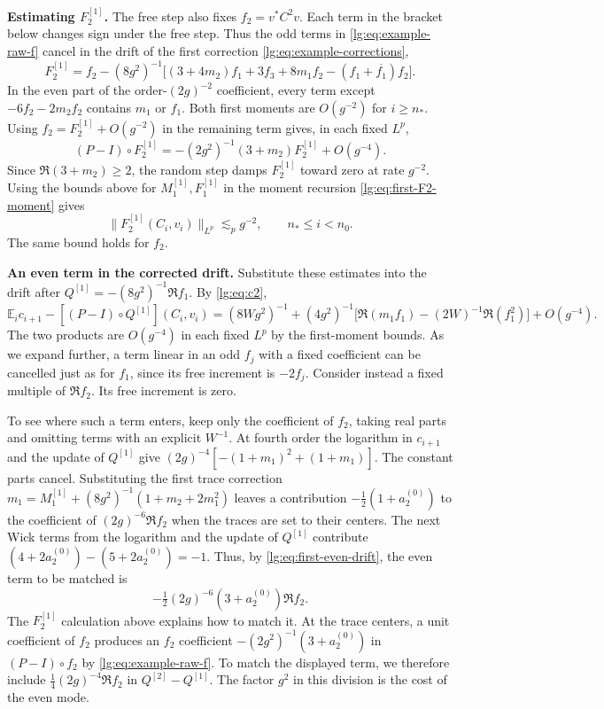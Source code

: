 \documentclass[11pt]{article}
\numberwithin{equation}{section}
\theoremstyle{remark}
\newcommand{\E}{\mathbb E}
\begin{document}
\medskip\noindent\textbf{Estimating $F_2^{[1]}$.}
The free step also fixes $f_2=v^*C^2v$. Each term in the bracket
below changes sign under the free step. Thus the odd terms in
\eqref{lg:eq:example-raw-f} cancel in the drift of the first
correction \eqref{lg:eq:example-corrections},
\[
 F_2^{[1]}=f_2-(8g^2)^{-1}
 \bigl[(3+4m_2)f_1+3f_3+8m_1f_2-(f_1+\overline{f_1})f_2\bigr].
\]
In the even part of the order-$(2g)^{-2}$ coefficient, every term
except $-6f_2-2m_2f_2$ contains $m_1$ or $f_1$. Both first moments
are $O(g^{-2})$ for $i\ge n_*$. Using $f_2=F_2^{[1]}+O(g^{-2})$
in the remaining term gives, in each fixed $L^p$,
\[
 (P-I)\circ F_2^{[1]}
 =-(2g^2)^{-1}(3+m_2)F_2^{[1]}+O(g^{-4}).
\]
Since $\Re(3+m_2)\ge2$, the random step damps $F_2^{[1]}$ toward
zero at rate $g^{-2}$. Using the bounds above for
$M_1^{[1]},F_1^{[1]}$ in the moment recursion
\eqref{lg:eq:first-F2-moment} gives
\[
 \|F_2^{[1]}(C_i,v_i)\|_{L^p}\lesssim_p g^{-2},
 \qquad n_*\le i<n_0.
\]
The same bound holds for $f_2$.

\medskip\noindent\textbf{An even term in the corrected drift.}
Substitute these estimates into the drift after
$Q^{[1]}=-(8g^2)^{-1}\Re f_1$. By \eqref{lg:eq:c2},
\[
 \E_i c_{i+1}-[(P-I)\circ Q^{[1]}](C_i,v_i)
 =(8Wg^2)^{-1}+(4g^2)^{-1}
  \bigl[\Re(m_1f_1)-(2W)^{-1}\Re(f_1^2)\bigr]+O(g^{-4}).
\]
The two products are $O(g^{-4})$ in each fixed $L^p$ by the
first-moment bounds. As we expand further,
a term linear in an odd $f_j$ with a fixed coefficient can be cancelled
just as for $f_1$, since its free increment is $-2f_j$.
Consider instead a fixed multiple of $\Re f_2$. Its free increment is zero.

To see where such a term enters, keep only the coefficient of $f_2$,
taking real parts and omitting terms with an explicit $W^{-1}$.
At fourth order the logarithm in $c_{i+1}$ and the update of $Q^{[1]}$
give $(2g)^{-4}[-(1+m_1)^2+(1+m_1)]$. The constant parts cancel.
Substituting the first trace correction
$m_1=M_1^{[1]}+(8g^2)^{-1}(1+m_2+2m_1^2)$ leaves a contribution
$-\tfrac12(1+a_2^{(0)})$ to the coefficient of $(2g)^{-6}\Re f_2$
when the traces are set to their centers. The next Wick terms from the
logarithm and the update of $Q^{[1]}$ contribute
$(4+2a_2^{(0)})-(5+2a_2^{(0)})=-1$. Thus, by \eqref{lg:eq:first-even-drift}, the even term to be matched is
\[
 -\tfrac12(2g)^{-6}(3+a_2^{(0)})\Re f_2 .
\]
The $F_2^{[1]}$ calculation above explains how to match it.
At the trace centers, a unit coefficient of $f_2$ produces an $f_2$
coefficient $-(2g^2)^{-1}(3+a_2^{(0)})$ in $(P-I)\circ f_2$
by \eqref{lg:eq:example-raw-f}. To match the displayed term, we therefore
include $\tfrac14(2g)^{-4}\Re f_2$ in $Q^{[2]}-Q^{[1]}$. The factor
$g^2$ in this division is the cost of the even mode.
\end{document}

